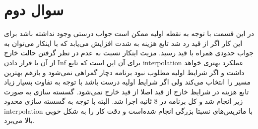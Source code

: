 \documentclass[12 pt]{article}
\begin{document}
\section*{سوال دوم}
در این قسمت با توجه به نقطه اولیه ممکن است جواب درستی وجود نداشته باشد برای این کار اگر از قید رد شد تابع هزینه به شدت افزایش می‌یابد که با اینکار می‌توان به جواب حدودی همراه با قید رسید. مزیت اینکار نسبت به عدم در نظر گرفتن حالت خارج از آن یا قرار دادن Inf برای آن این است که تابع interpolation عملکرد بهتری خواهد داشت و اگر شرایط اولیه مطلوب نبود برنامه دچار گمراهی نمی‌شود و بازهم بهترین  مسیر را انتخاب می‌کند ولی اگر شرایط اولیه درست باشد با توجه به تفاوت بسیار زیاد تابع هزینه‌ در شرایظ خارج از قید اصلا از قید خارج نمی‌شود.
گسسته سازی به صورت زیر انجام شد و کل برنامه در 8 ثانیه اجرا شد. البته با توجه به گسسته سازی محدود interpolation با ماتریس‌های نسبتا بزرگی انجام شده‌است و دقت کار را به شکل خوبی بالا می‌برد.
\end{document}
